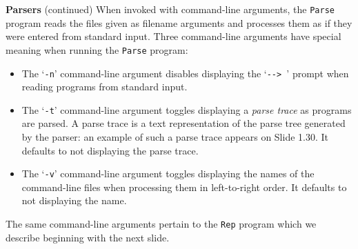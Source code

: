 \begin{minipage}[t]{\sw}
\slidenumber
\LARGE
{\bf Parsers} (continued)\exx
{\Large
\emm\LightBox{\MYlonGrammarOnly}\exx
}
When invoked with command-line arguments,
the \verb'Parse' program reads the files given as filename arguments
and processes them as if they were entered
from standard input.\exx
Three command-line arguments have special meaning
when running the \verb'Parse' program:
\begin{itemize}
\parskip -0.5ex
\item The `\verb'-n'' command-line argument disables
      displaying the `\verb'--> '' prompt
      when reading programs from standard input.
\item The `\verb'-t'' command-line argument 
      toggles displaying a {\em parse trace}
      as programs are parsed.
      A parse trace is a text representation
      of the parse tree generated by the parser:
      an example of such a parse trace appears
      on Slide 1.30.
      It defaults to not displaying the parse trace.
\item The `\verb'-v'' command-line argument
      toggles displaying the names of the command-line files
      when processing them in left-to-right order.
      It defaults to not displaying the name.
\end{itemize}
The same command-line arguments pertain
to the \verb'Rep' program which we describe
beginning with the next slide.
\end{minipage}
\clearpage
